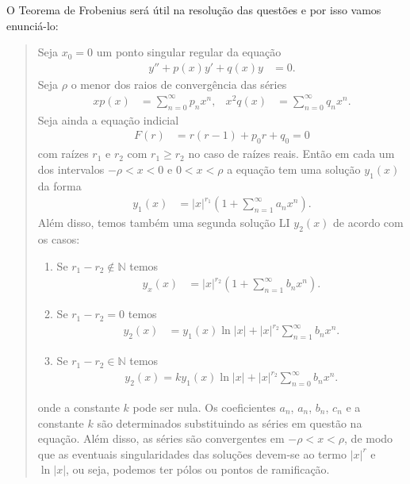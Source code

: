 \documentclass[a4paper,12pt, leqno, answers]{exam}
\begin{document}
\thispagestyle{empty}

\newpage
\setcounter{page}{1}
O Teorema de Frobenius ser\'{a} útil na resolu\c{c}\~{a}o das quest\~{o}es e por isso vamos enunci\'{a}-lo:
\begin{quote}
    Seja $x_0 = 0$ um ponto singular regular da equa\c{c}\~{a}o
    \begin{align*}
        y'' + p(x) y' + q(x) y &= 0.
    \end{align*}
    Seja $\rho$ o menor dos raios de converg\^{e}ncia das s\'{e}ries
    \begin{align*}
        x p(x) &= \sum_{n = 0}^\infty p_n x^n, & x^2 q(x) &= \sum_{n = 0}^\infty q_n x^n.
    \end{align*}
    Seja ainda a equa\c{c}\~{a}o indicial
    \begin{align*}
        F(r) &= r \left( r - 1 \right) + p_0 r + q_0 = 0
    \end{align*}
    com ra\'{i}zes $r_1$ e $r_2$ com $r_1 \geq r_2$ no caso de ra\'{i}zes reais. Ent\~{a}o em cada um dos intervalos $-\rho < x < 0$ e $0 < x < \rho$ a equa\c{c}\~{a}o tem uma solu\c{c}\~{a}o $y_1(x)$ da forma
    \begin{align*}
        y_1(x) &= |x|^{r_1} \left( 1 + \sum_{n = 1}^\infty a_n x^n \right).
    \end{align*}
    Al\'{e}m disso, temos tamb\'{e}m uma segunda solu\c{c}\~{a}o LI $y_2(x)$ de acordo com os casos:
    \begin{enumerate}
        \item Se $r_1 - r_2 \not\in \mathbb{N}$ temos
            \begin{align*}
                y_x(x) &= |x|^{r_2} \left( 1 + \sum_{n = 1}^\infty b_n x^n \right).
            \end{align*}
        \item Se $r_1 - r_2 = 0$ temos
            \begin{align*}
                y_2(x) &= y_1(x) \ln |x| + |x|^{r_2} \sum_{n = 1}^\infty b_n x^n.
            \end{align*}
        \item Se $r_1 - r_2 \in \mathbb{N}$ temos
            \begin{align*}
                y_2(x) = k y_1(x) \ln |x| + |x|^{r_2} \sum_{n = 0}^\infty b_n x^n.
            \end{align*}
    \end{enumerate}
    onde a constante $k$ pode ser nula. Os coeficientes $a_n$, $a_n$, $b_n$, $c_n$ e a constante $k$ s\~{a}o determinados substituindo as s\'{e}ries em quest\~{a}o na equa\c{c}\~{a}o. Al\'{e}m disso, as s\'{e}ries s\~{a}o convergentes em $-\rho < x < \rho$, de modo que as eventuais singularidades das solu\c{c}\~{o}es devem-se ao termo $|x|^r$ e $\ln |x|$, ou seja, podemos ter p\'{o}los ou pontos de ramifica\c{c}\~{a}o.
\end{quote}
\end{document}
